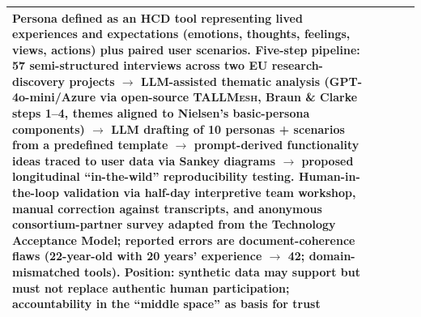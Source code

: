 \begin{table}[t]
\begin{tabular}{p{0.5cm} p{3.6cm} p{3.4cm} p{3.6cm} p{3.6cm}}
Persona defined as an HCD tool representing lived experiences and expectations (emotions, thoughts, feelings, views, actions) plus paired user scenarios. Five-step pipeline: 57 semi-structured interviews across two EU research-discovery projects $\rightarrow$ LLM-assisted thematic analysis (GPT-4o-mini/Azure via open-source \textsc{TALLMesh}, Braun \& Clarke steps 1--4, themes aligned to Nielsen's basic-persona components) $\rightarrow$ LLM drafting of 10 personas + scenarios from a predefined template $\rightarrow$ prompt-derived functionality ideas traced to user data via Sankey diagrams $\rightarrow$ proposed longitudinal ``in-the-wild'' reproducibility testing. Human-in-the-loop validation via half-day interpretive team workshop, manual correction against transcripts, and anonymous consortium-partner survey adapted from the Technology Acceptance Model; reported errors are document-coherence flaws (22-year-old with 20 years' experience $\rightarrow$ 42; domain-mismatched tools). Position: synthetic data may support but must not replace authentic human participation; accountability in the ``middle space'' as basis for trust \\
\bottomrule
\end{tabular}
\end{table}
